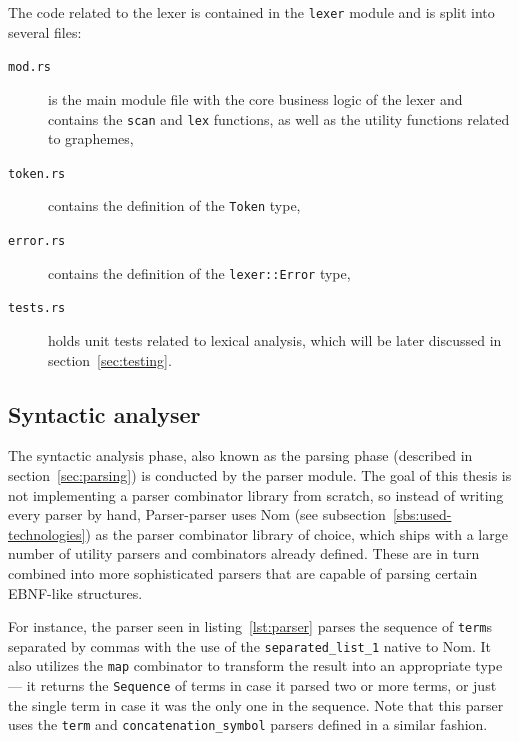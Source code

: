 \documentclass[english,engineering]{wizthesis}
\newcommand{\thisproject}{Parser-parser}
\begin{document}
The code related to the lexer is contained in the \texttt{lexer} module and is
split into several files:
\begin{description}
  \item[\texttt{mod.rs}] is the main module file with the core business logic of
  the lexer and contains the \texttt{scan} and \texttt{lex} functions, as well
  as the utility functions related to graphemes,
  \item[\texttt{token.rs}] contains the definition of the \texttt{Token} type,
  \item[\texttt{error.rs}] contains the definition of the \texttt{lexer::Error}
  type,
  \item[\texttt{tests.rs}] holds unit tests related to lexical analysis, which
  will be later discussed in section~\ref{sec:testing}.
\end{description}

\subsection{Syntactic analyser} \label{sbs:syntactic-analyser}

The syntactic analysis phase, also known as the parsing phase (described in
section~\ref{sec:parsing}) is conducted by the parser module. The goal of this
thesis is not implementing a parser combinator library from scratch, so instead
of writing every parser by hand, \thisproject{} uses Nom (see
subsection~\ref{sbs:used-technologies}) as the parser combinator library of
choice, which ships with a large number of utility parsers and combinators
already defined. These are in turn combined into more sophisticated parsers that
are capable of parsing certain EBNF-like structures.


For instance, the parser seen in listing~\ref{lst:parser} parses the sequence of
\texttt{term}s separated by commas with the use of the
\texttt{separated\_list\_1} native to Nom. It also utilizes the \texttt{map}
combinator to transform the result into an appropriate type --- it returns the
\texttt{Sequence} of terms in case it parsed two or more terms, or just the
single term in case it was the only one in the sequence. Note that this parser
uses the \texttt{term} and \texttt{concatenation\_symbol} parsers defined
in a similar fashion.
\end{document}
